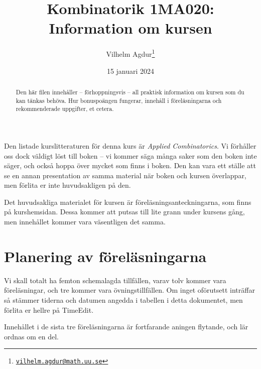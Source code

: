\documentclass{tufte-handout}
\title{Kombinatorik 1MA020: Information om kursen}
\author[Vilhelm Agdur]{Vilhelm Agdur\thanks{\href{mailto:vilhelm.agdur@math.uu.se}{\nolinkurl{vilhelm.agdur@math.uu.se}}}}
\date{15 januari 2024}
\begin{document}
\maketitle%

\begin{abstract}
\noindent
Den här filen innehåller -- förhoppningsvis -- all praktisk information om kursen som du kan tänkas behöva. Hur bonuspoängen fungerar, innehåll
i föreläsningarna och rekommenderade uppgifter, et cetera. 
\end{abstract}

Den listade kurslitteraturen för denna kurs är \emph{Applied Combinatorics}\cite{mainTextbook}. Vi förhåller oss dock väldigt löst till boken -- vi kommer säga många saker som den boken inte säger, och också hoppa över mycket som finns i boken. Den kan vara ett ställe att se en annan presentation av samma material när boken och kursen överlappar, men förlita er inte huvudsakligen på den.

Det huvudsakliga materialet för kursen är föreläsningsanteckningarna, som finns på kurshemsidan. Dessa kommer att putsas till lite grann under kursens gång, men innehållet kommer vara väsentligen det samma.

\section{Planering av föreläsningarna}

Vi skall totalt ha femton schemalagda tillfällen, varav tolv kommer vara föreläsningar, och tre kommer vara övningstillfällen. Om inget oförutsett inträffar så stämmer tiderna och datumen angedda i tabellen i detta dokumentet, men förlita er hellre på TimeEdit.

Innehållet i de sista tre föreläsningarna är fortfarande aningen flytande, och lär ordnas om en del.
\end{document}
